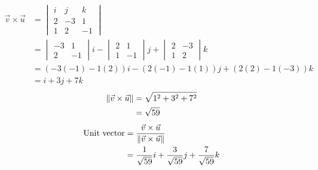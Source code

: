 \begin{align*}
    \vec{v} \times \vec{u} & = \begin{vmatrix}
                                   i & j  & k  \\
                                   2 & -3 & 1  \\
                                   1 & 2  & -1
                               \end{vmatrix}                      \\
                           & = \begin{vmatrix}
                                   -3 & 1  \\
                                   2  & -1
                               \end{vmatrix}i - \begin{vmatrix}
                                                    2 & 1  \\
                                                    1 & -1
                                                \end{vmatrix}j + \begin{vmatrix}
                                                                     2 & -3 \\
                                                                     1 & 2
                                                                 \end{vmatrix}k     \\
                           & = (-3(-1) - 1(2))i - (2(-1) - 1(1))j + (2(2) - 1(-3))k \\
                           & = i + 3j + 7k
\end{align*}
\begin{align*}
    \left\lVert\vec{v} \times \vec{u}\right\rVert & = \sqrt{1^2 + 3^2 + 7^2} \\
                                  & = \sqrt{59}
\end{align*}
\begin{align*}
    \text{Unit vector} & = \frac{\vec{v} \times \vec{u}}{\left\lVert\vec{v} \times \vec{u}\right\rVert}       \\
                       & = \frac{1}{\sqrt{59}}i + \frac{3}{\sqrt{59}}j + \frac{7}{\sqrt{59}}k
\end{align*}